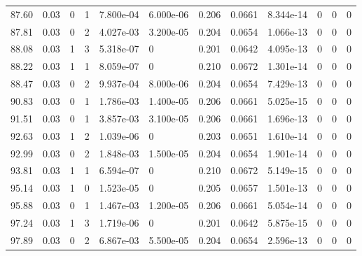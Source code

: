 \documentclass[preview]{standalone}
\begin{document}
{{{\begin{tabular}{L{1.2cm}C{1.2cm} C{0.3cm}C{0.5cm} C{1.4cm}C{1.4cm} C{1.4cm}C{1.4cm} C{1.6cm}C{1.6cm} C{1.6cm}C{1.6cm}}
  87.60  &  0.03  & 0     &  1 &  7.800e-04  & 6.000e-06  &  0.206&   0.0661& 8.344e-14 & 0   &  0 & 0  \\ 
  87.81  &  0.03  & 0     &  2 &  4.027e-03  & 3.200e-05  &  0.204&   0.0654& 1.066e-13 & 0   &  0 & 0  \\ 
  88.08  &  0.03  & 1     &  3 &  5.318e-07  & 0  &  0.201&   0.0642& 4.095e-13 & 0   &  0 & 0  \\ 
  88.22  &  0.03  & 1     &  1 &  8.059e-07  & 0  &  0.210&   0.0672& 1.301e-14 & 0   &  0 & 0  \\ 
  88.47  &  0.03  & 0     &  2 &  9.937e-04  & 8.000e-06  &  0.204&   0.0654& 7.429e-13 & 0   &  0 & 0  \\ 
  90.83  &  0.03  & 0     &  1 &  1.786e-03  & 1.400e-05  &  0.206&   0.0661& 5.025e-15 & 0   &  0 & 0  \\ 
  91.51  &  0.03  & 0     &  1 &  3.857e-03  & 3.100e-05  &  0.206&   0.0661& 1.696e-13 & 0   &  0 & 0  \\ 
  92.63  &  0.03  & 1     &  2 &  1.039e-06  & 0  &  0.203&   0.0651& 1.610e-14 & 0   &  0 & 0  \\ 
  92.99  &  0.03  & 0     &  2 &  1.848e-03  & 1.500e-05  &  0.204&   0.0654& 1.901e-14 & 0   &  0 & 0  \\ 
  93.81  &  0.03  & 1     &  1 &  6.594e-07  & 0  &  0.210&   0.0672& 5.149e-15 & 0   &  0 & 0  \\ 
  95.14  &  0.03  & 1     &  0 &  1.523e-05  & 0  &  0.205&   0.0657& 1.501e-13 & 0   &  0 & 0  \\ 
  95.88  &  0.03  & 0     &  1 &  1.467e-03  & 1.200e-05  &  0.206&   0.0661& 5.054e-14 & 0   &  0 & 0  \\ 
  97.24  &  0.03  & 1     &  3 &  1.719e-06  & 0  &  0.201&   0.0642& 5.875e-15 & 0   &  0 & 0  \\ 
  97.89  &  0.03  & 0     &  2 &  6.867e-03  & 5.500e-05  &  0.204&   0.0654& 2.596e-13 & 0   &  0 & 0  \\ 
\hline 
\end{tabular} 

}}}
\end{document}
